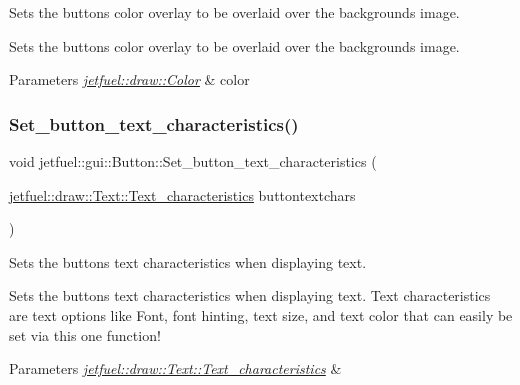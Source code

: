 Sets the button\textquotesingle{}s color overlay to be overlaid over the background\textquotesingle{}s image. 

Sets the button\textquotesingle{}s color overlay to be overlaid over the background\textquotesingle{}s image.


\begin{DoxyParams}{Parameters}
{\em \hyperlink{classjetfuel_1_1draw_1_1Color}{jetfuel\+::draw\+::\+Color}} & color \\
\hline
\end{DoxyParams}
\mbox{\label{classjetfuel_1_1gui_1_1Button_ab2cf5dbf928df48a55118652e003519a}} 
\subsubsection{\texorpdfstring{Set\+\_\+button\+\_\+text\+\_\+characteristics()}{Set\_button\_text\_characteristics()}}
{\footnotesize\ttfamily void jetfuel\+::gui\+::\+Button\+::\+Set\+\_\+button\+\_\+text\+\_\+characteristics (\begin{DoxyParamCaption}\item[{\hyperlink{structjetfuel_1_1draw_1_1Text_1_1Text__characteristics}{jetfuel\+::draw\+::\+Text\+::\+Text\+\_\+characteristics}}]{buttontextchars }\end{DoxyParamCaption})\hspace{0.3cm}{\ttfamily [inline]}}



Sets the button\textquotesingle{}s text characteristics when displaying text. 

Sets the button\textquotesingle{}s text characteristics when displaying text. Text characteristics are text options like Font, font hinting, text size, and text color that can easily be set via this one function!


\begin{DoxyParams}{Parameters}
{\em \hyperlink{structjetfuel_1_1draw_1_1Text_1_1Text__characteristics}{jetfuel\+::draw\+::\+Text\+::\+Text\+\_\+characteristics}} & \\
\hline
\end{DoxyParams}
\mbox{\label{classjetfuel_1_1gui_1_1Button_a4b256fdcf0ae28d8fb258b0f89d19536}} 
